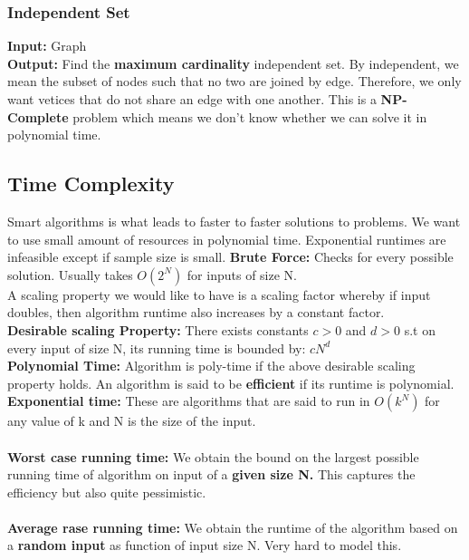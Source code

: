 \documentclass[11pt, oneside]{article}
\theoremstyle{definition}
\begin{document}
\subsubsection{Independent Set}
\textbf{Input: }Graph\\
\textbf{Output: } Find the \textbf{maximum cardinality} independent set. By independent, we mean the subset of nodes such that no two are joined by edge. Therefore, we only want vetices that do not share an edge with one another. This is a \textbf{NP-Complete} problem which means we don't know whether we can solve it in polynomial time.

\subsection{Time Complexity}
Smart algorithms is what leads to faster to faster solutions to problems.
We want to use small amount of resources in polynomial time. Exponential runtimes are infeasible except if sample size is small.
\newline
\newline
\textbf{Brute Force: }Checks for every possible solution. Usually takes $O(2^N)$ for inputs of size N.\\
A scaling property we would like to have is a scaling factor whereby if input doubles, then algorithm runtime also increases by a constant factor. \\
\textbf{Desirable scaling Property:} There exists constants $c>0$ and $d>0$ s.t on every input of size N, its running time is bounded by: \textbf{$cN^d$}\\
\textbf{Polynomial Time:} Algorithm is poly-time if the above desirable scaling property holds. An algorithm is said to be \textbf{efficient} if its runtime is polynomial. \\
\textbf{Exponential time:} These are algorithms that are said to run in \textbf{$O(k^N)$} for any value of k and N is the size of the input.\\\\
\textbf{Worst case running time:} We obtain the bound on the largest possible running time of algorithm on input of a \textbf{given size N.} This captures the efficiency but also quite pessimistic. \\\\
\textbf{Average rase running time:} We obtain the runtime of the algorithm based on a \textbf{random input} as function of input size N. Very hard to model this.
\end{document}
